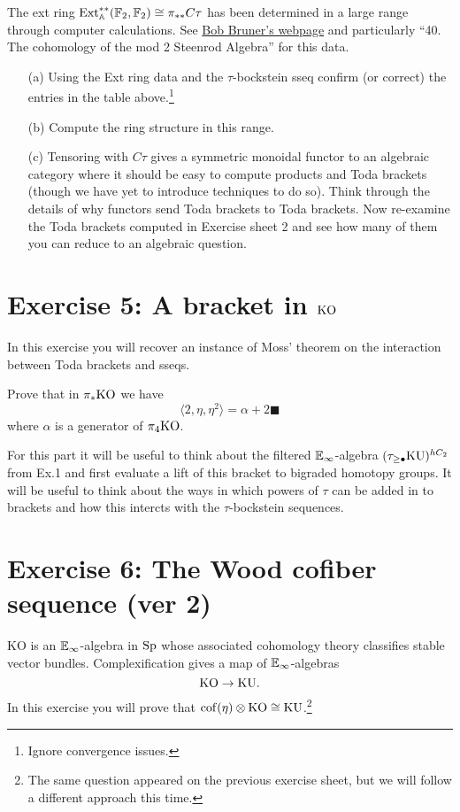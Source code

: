 \documentclass[reqno]{amsart}
\begin{document}
The ext ring $\operatorname{Ext}_{\mathbb{A}}^{**}(\mathbb{F}_2,\mathbb{F}_2) \cong \pi_{**}C\tau$ has been determined in a large range through computer calculations.
See \href{http://www.rrb.wayne.edu/papers/index.html}{Bob Bruner's webpage} and particularly ``40. The cohomology of the mod 2 Steenrod Algebra'' for this data.

\begin{itemize}
\item[(a)] Using the Ext ring data and the $\tau$-bockstein sseq
  confirm (or correct) the entries in the table above.\footnote{Ignore convergence issues.}
\item[(b)] Compute the ring structure in this range.
\item[(c)] Tensoring with $C\tau$ gives a symmetric monoidal functor to an algebraic category where it should be easy to compute products and Toda brackets (though we have yet to introduce techniques to do so). Think through the details of why functors send Toda brackets to Toda brackets. Now re-examine the Toda brackets computed in Exercise sheet 2 and see how many of them you can reduce to an algebraic question.
\end{itemize}

\section{\bf Exercise 5: A bracket in $\mathrm{KO}$}

In this exercise you will recover an instance of Moss' theorem on
the interaction between Toda brackets and sseqs.

Prove that in $\pi_*\mathrm{KO}$ we have
\[ \langle 2, \eta, \eta^2 \rangle = \alpha + 2\blacksquare \]
where $\alpha$ is a generator of $\pi_4\mathrm{KO}$.

For this part it will be useful to think about the filtered $\mathbb{E}_\infty$-algebra
$(\tau_{\geq \bullet} \mathrm{KU})^{hC_2}$ from Ex.1 and first evaluate a lift of this bracket to bigraded homotopy groups.
It will be useful to think about the ways in which powers of $\tau$ can be added in to brackets and how this intercts with the $\tau$-bockstein sequences.



\section{\bf Exercise 6: The Wood cofiber sequence (ver 2)}

$\mathrm{KO}$ is an $\mathbb{E}_\infty$-algebra in $\mathrm{Sp}$ whose associated cohomology theory
classifies stable vector bundles.
Complexification gives a map of $\mathbb{E}_\infty$-algebras
\[ \mathrm{KO} \to \mathrm{KU}. \]
In this exercise you will prove that $\operatorname{cof}(\eta) \otimes \mathrm{KO} \cong \mathrm{KU}$.\footnote{The same question appeared on the previous exercise sheet, but we will follow a different approach this time.}
\end{document}
